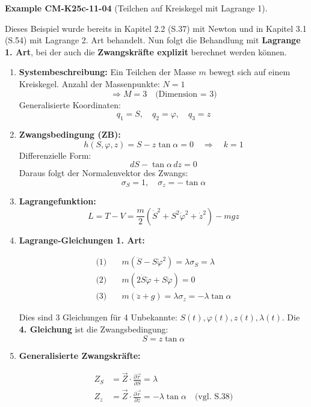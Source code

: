 \documentclass[10pt, letterpaper]{article}
\newcommand{\CustomHeading}[3]{%
  \par\medskip\noindent%
  \textbf{#1 #2} \textnormal{(#3)}.\enskip%
}
\newenvironment{EXA}[2]{\CustomHeading{Example}{#1}{#2}}{}
\begin{document}
\begin{EXA}{CM-K25c-11-04}{Teilchen auf Kreiskegel mit Lagrange 1}
Dieses Beispiel wurde bereits in Kapitel 2.2 (S.37) mit Newton und in Kapitel 3.1 (S.54) mit Lagrange 2. Art behandelt.  
Nun folgt die Behandlung mit \textbf{Lagrange 1. Art}, bei der auch die \textbf{Zwangskräfte explizit} berechnet werden können.

\begin{enumerate}[label=\textbf{\arabic*)}, itemsep=1.5em]

\item \textbf{Systembeschreibung:}  
Ein Teilchen der Masse \( m \) bewegt sich auf einem Kreiskegel.  
Anzahl der Massenpunkte: \( N = 1 \)  
\[
\Rightarrow M = 3 \quad \text{(Dimension = 3)}
\]  
Generalisierte Koordinaten:
\[
q_1 = S, \quad q_2 = \varphi, \quad q_3 = z
\]

\item \textbf{Zwangsbedingung (ZB):}
\[
h(S, \varphi, z) = S - z \tan\alpha = 0 \quad \Rightarrow \quad k = 1
\]
Differenzielle Form:
\[
dS - \tan\alpha \, dz = 0
\]
Daraus folgt der Normalenvektor des Zwangs:
\[
\sigma_S = 1, \quad \sigma_z = -\tan\alpha
\]

\item \textbf{Lagrangefunktion:}
\[
L = T - V = \frac{m}{2} \left( \dot{S}^2 + S^2 \dot{\varphi}^2 + \dot{z}^2 \right) - mgz
\]

\item \textbf{Lagrange-Gleichungen 1. Art:}

\begin{align*}
\text{(1)}\quad & m(\ddot{S} - S \dot{\varphi}^2) = \lambda \sigma_S = \lambda \\[0.5em]
\text{(2)}\quad & m(2 \dot{S} \dot{\varphi} + S \ddot{\varphi}) = 0 \\[0.5em]
\text{(3)}\quad & m(\ddot{z} + g) = \lambda \sigma_z = -\lambda \tan\alpha
\end{align*}

Dies sind 3 Gleichungen für 4 Unbekannte: \( S(t), \varphi(t), z(t), \lambda(t) \).  
Die \textbf{4. Gleichung} ist die Zwangsbedingung:
\[
S = z \tan\alpha
\]

\item \textbf{Generalisierte Zwangskräfte:}

\begin{align*}
Z_S &= \vec{Z} \cdot \frac{\partial \vec{r}}{\partial S} = \lambda \\[0.5em]
Z_z &= \vec{Z} \cdot \frac{\partial \vec{r}}{\partial z} = -\lambda \tan\alpha \quad \text{(vgl. S.38)}
\end{align*}


\end{enumerate}
\end{EXA}
\end{document}
